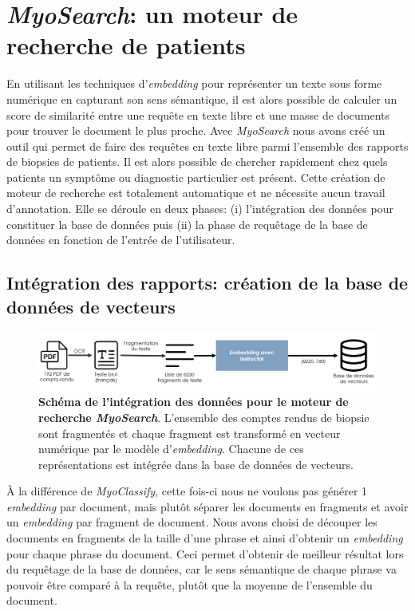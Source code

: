 \section{\textit{MyoSearch}: un moteur de recherche de patients}
En utilisant les techniques d'\textit{embedding}  pour représenter un texte sous forme numérique en capturant son sens sémantique, il est alors possible de calculer un score de similarité entre une requête en texte libre et une masse de documents pour trouver le document le plus proche. Avec \textit{MyoSearch} nous avons créé un outil qui permet de faire des requêtes en texte libre parmi l'ensemble des rapports de biopsies de patients. Il est alors possible de chercher rapidement chez quels patients un symptôme ou diagnostic particulier est présent. Cette création de moteur de recherche est totalement automatique et ne nécessite aucun travail d'annotation. Elle se déroule en deux phases: (i) l'intégration des données pour constituer la base de données puis (ii) la phase de requêtage de la base de données en fonction de l'entrée de l'utilisateur.

\subsection{Intégration des rapports: création de la base de données de vecteurs}
\begin{figure}[!ht]
 \centering
 \includegraphics[width=1\textwidth]{figures/myosearch_ingest.png}
 \caption[Intégration des données dans \textit{MyoSearch}]{\textbf{Schéma de l'intégration des données pour le moteur de recherche \textit{MyoSearch}}. L'ensemble des comptes rendus de biopsie sont fragmentés et chaque fragment est transformé en vecteur numérique par le modèle d'\textit{embedding}. Chacune de ces représentations est intégrée dans la base de données de vecteurs.}
 \label{fig:myosearch_ingest}
\end{figure}

À la différence de \textit{MyoClassify}, cette fois-ci nous ne voulons pas générer 1 \textit{embedding} par document, mais plutôt séparer les documents en fragments et avoir un \textit{embedding} par fragment de document. Nous avons choisi de découper les documents en fragments de la taille d'une phrase et ainsi d'obtenir un \textit{embedding} pour chaque phrase du document. Ceci permet d'obtenir de meilleur résultat lors du requêtage de la base de données, car le sens sémantique de chaque phrase va pouvoir être comparé à la requête, plutôt que la moyenne de l'ensemble du document.

